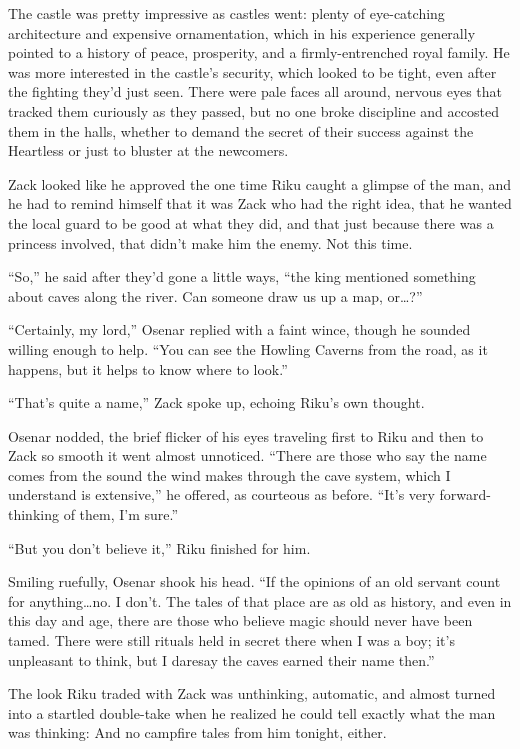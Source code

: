 The castle was pretty impressive as castles went: plenty of eye-catching architecture and expensive ornamentation, which in his experience generally pointed to a history of peace, prosperity, and a firmly-entrenched royal family. He was more interested in the castle's security, which looked to be tight, even after the fighting they'd just seen. There were pale faces all around, nervous eyes that tracked them curiously as they passed, but no one broke discipline and accosted them in the halls, whether to demand the secret of their success against the Heartless or just to bluster at the newcomers.

Zack looked like he approved the one time Riku caught a glimpse of the man, and he had to remind himself that it was Zack who had the right idea, that he wanted the local guard to be good at what they did, and that just because there was a princess involved, that didn't make him the enemy. Not this time.

``So,'' he said after they'd gone a little ways, ``the king mentioned something about caves along the river. Can someone draw us up a map, or\ldots ?''

``Certainly, my lord,'' Osenar replied with a faint wince, though he sounded willing enough to help. ``You can see the Howling Caverns from the road, as it happens, but it helps to know where to look.''

``That's quite a name,'' Zack spoke up, echoing Riku's own thought.

Osenar nodded, the brief flicker of his eyes traveling first to Riku and then to Zack so smooth it went almost unnoticed. ``There are those who say the name comes from the sound the wind makes through the cave system, which I understand is extensive,'' he offered, as courteous as before. ``It's very forward-thinking of them, I'm sure.''

``But you don't believe it,'' Riku finished for him.

Smiling ruefully, Osenar shook his head. ``If the opinions of an old servant count for anything\ldots no. I don't. The tales of that place are as old as history, and even in this day and age, there are those who believe magic should never have been tamed. There were still rituals held in secret there when I was a boy; it's unpleasant to think, but I daresay the caves earned their name then.''

The look Riku traded with Zack was unthinking, automatic, and almost turned into a startled double-take when he realized he could tell exactly what the man was thinking: And no campfire tales from him tonight, either.

